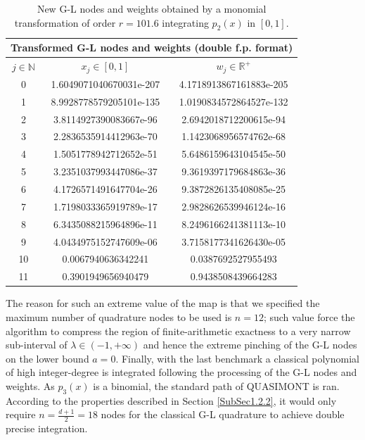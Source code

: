 \documentclass[a4paper, twosided]{book}
\begin{document}
\begin{table}[H]
\centering
\begin{tabular}{|c||c|c|}
\hline
\multicolumn{3}{|c|}{\textbf{Transformed G-L nodes and weights (double f.p. format)}} \\
\hline
$j\in\mathbb{N}$ & $x_j\in[0,1]$ & $w_j\in\mathbb{R}^+$ \\
\hline
0   &  1.6049071040670031e-207  &  4.1718913867161883e-205  \\
1   &  8.9928778579205101e-135  &  1.0190834572864527e-132  \\
2   &  3.8114927390083667e-96   &  2.6942018712200615e-94   \\
3   &  2.2836535914412963e-70   &  1.1423068956574762e-68   \\
4   &  1.5051778942712652e-51   &  5.6486159643104545e-50   \\
5   &  3.2351037993447086e-37   &  9.3619397179684863e-36   \\
6   &  4.1726571491647704e-26   &  9.3872826135408085e-25   \\
7   &  1.7198033365919789e-17   &  2.9828626539946124e-16   \\
8   &  6.3435088215964896e-11   &  8.2496166241381113e-10   \\
9   &  4.0434975152747609e-06   &  3.7158177341626430e-05   \\
10  &  0.0067940636342241       &  0.0387692527955493       \\
11  &  0.3901949656940479       &  0.9438508439664283       \\
\hline
\end{tabular}
  \caption{New G-L nodes and weights obtained by a monomial transformation of order $r=101.6$ integrating $p_2(x)$ in $[0,1]$.}
  \label{table2.2}
\end{table}

\noindent
The reason for such an extreme value of the map is that we specified the maximum number of quadrature nodes to be used is $n=12$; such value force the algorithm to compress the region of finite-arithmetic exactness to a very narrow sub-interval of $\lambda\in(-1,+\infty)$ and hence the extreme pinching of the G-L nodes on the lower bound $a=0$. Finally, with the last benchmark a classical polynomial of high integer-degree is integrated following the processing of the G-L nodes and weights. As $p_3(x)$ is a binomial, the standard path of QUASIMONT is ran. According to the properties described in Section \ref{SubSec1.2.2}, it would only require $n=\frac{d+1}{2}=18$ nodes for the classical G-L quadrature to achieve double precise integration.
\end{document}
